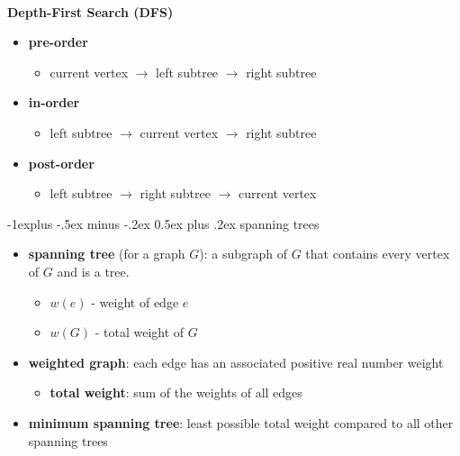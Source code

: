 \documentclass[10pt, landscape]{article}
\makeatletter
\renewcommand{\subsection}{\@startsection{subsection}{2}{0mm}%
                                {-1explus -.5ex minus -.2ex}%
                                {0.5ex plus .2ex}%
                                {\normalfont\normalsize\bfseries}}
\let\then\rightarrow
\makeatother
\begin{document}
\begin{multicols}{4}
\ 
\\ \textbf{Depth-First Search (DFS)}
\begin{itemize}
    \item \textbf{pre-order}
    \begin{itemize}
        \item current vertex $\then$ left subtree $\then$ right subtree
    \end{itemize}
    \item \textbf{in-order}
    \begin{itemize}
        \item left subtree $\then$ current vertex $\then$ right subtree
    \end{itemize}
    \item \textbf{post-order}
    \begin{itemize}
        \item left subtree $\then$ right subtree $\then$ current vertex 
    \end{itemize}
\end{itemize}

\subsection{spanning trees}
\begin{itemize}
    \item \textbf{spanning tree} (for a graph $G$): a subgraph of $G$ that contains every vertex of $G$ and is a tree.
    \begin{itemize}
        \item $w(e)$ - weight of edge $e$
        \item $w(G)$ - total weight of $G$
    \end{itemize}
    \item \textbf{weighted graph}: each edge has an associated positive real number weight
    \begin{itemize}
        \item \textbf{total weight}: sum of the weights of all edges
    \end{itemize}
    \item \textbf{minimum spanning tree}: least possible total weight compared to all other spanning trees
\end{itemize}


\end{multicols}
\end{document}
